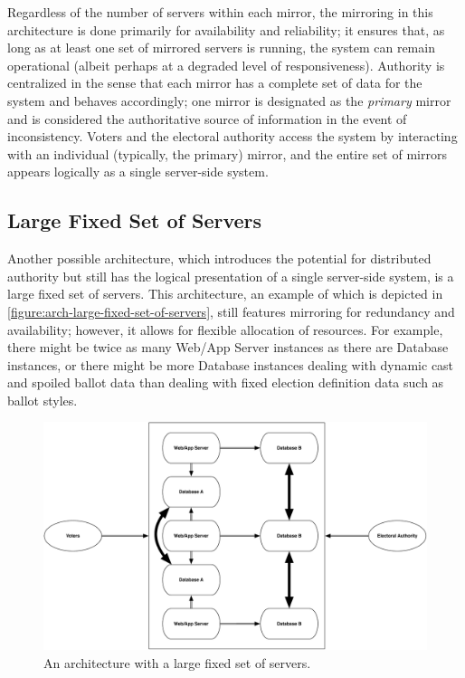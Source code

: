 Regardless of the number of servers within each mirror, the mirroring
in this architecture is done primarily for availability and
reliability; it ensures that, as long as at least one set of mirrored
servers is running, the system can remain operational (albeit perhaps
at a degraded level of responsiveness). Authority is centralized in
the sense that each mirror has a complete set of data for the system
and behaves accordingly; one mirror is designated as the
\emph{primary} mirror and is considered the authoritative source of
information in the event of inconsistency. Voters and the electoral
authority access the system by interacting with an individual
(typically, the primary) mirror, and the entire set of mirrors appears
logically as a single server-side system.

\subsection{Large Fixed Set of Servers}

Another possible architecture, which introduces the potential for
distributed authority but still has the logical presentation of a
single server-side system, is a large fixed set of servers. This
architecture, an example of which is depicted in
\autoref{figure:arch-large-fixed-set-of-servers}, still features
mirroring for redundancy and availability; however, it allows for
flexible allocation of resources. For example, there might be twice as
many Web/App Server instances as there are Database instances, or
there might be more Database instances dealing with dynamic cast and
spoiled ballot data than dealing with fixed election definition data
such as ballot styles.

\begin{figure}[p]
\begin{center}
\includegraphics[width=5.5in]{architecture_resources/large-fixed-set-of-servers.pdf}
\end{center}
\caption{An architecture with a large fixed set of servers.}
\label{figure:arch-large-fixed-set-of-servers}
\end{figure}

